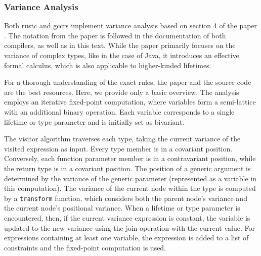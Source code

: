 \documentclass[
  11pt,
  twoside,symmetric]{report}
\begin{document}
\subsubsection{Variance Analysis}\label{sec:variance-analysis}

Both rustc and gccrs implement variance analysis based on section 4 of
the paper . The notation from the
paper is followed in the documentation of both compilers, as well as in
this text. While the paper primarily focuses on the variance of complex
types, like in the case of Java, it introduces an effective formal
calculus, which is also applicable to higher-kinded lifetimes.

For a thorough understanding of the exact rules, the paper and the
source code are the best resources. Here, we provide only a basic
overview. The analysis employs an iterative fixed-point computation,
where variables form a semi-lattice with an additional binary operation.
Each variable corresponds to a single lifetime or type parameter and is
initially set as bivariant.

The visitor algorithm traverses each type, taking the current variance
of the visited expression as input. Every type member is in a covariant
position. Conversely, each function parameter member is in a
contravariant position, while the return type is in a covariant
position. The position of a generic argument is determined by the
variance of the generic parameter (represented as a variable in this
computation). The variance of the current node within the type is
computed by a \texttt{transform} function, which considers both the
parent node's variance and the current node's positional variance. When
a lifetime or type parameter is encountered, then, if the current
variance expression is constant, the variable is updated to the new
variance using the join operation with the current value. For
expressions containing at least one variable, the expression is added to
a list of constraints and the fixed-point computation is used.
\end{document}

